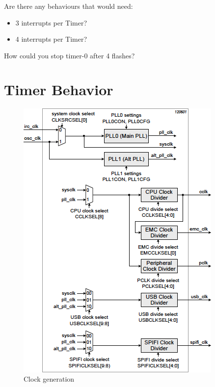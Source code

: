 \documentclass[a4paper]{tufte-handout}
\begin{document}
\begin{question}{}{}
  Are there any behaviours that would need:
  \begin{itemize}
  \item 3 interrupts per Timer?
  \item 4 interrupts per Timer?
  \end{itemize}
\end{question}

\begin{question}{}{}
  How could you stop timer-0 after 4 flashes?
\end{question}




\clearpage
\appendix
\section{Timer Behavior}\label{sec:timer-behavior}
\begin{figure}
\includegraphics[scale=0.65]{clock-gen}
  \caption{Clock generation}
  \label{fig:clockgeneration}
\end{figure}
\end{document}
